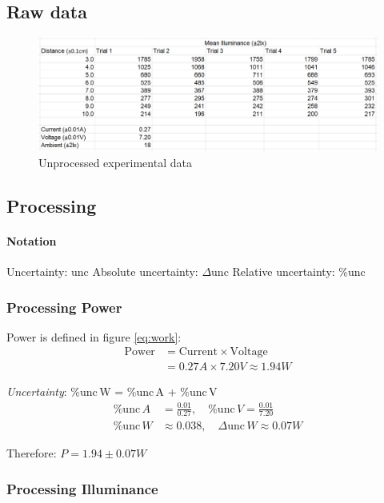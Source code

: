 \documentclass[a4paper,12pt]{article}
\newcommand{\absun}{\Delta \text{unc}\,}
\newcommand{\relun}{\% \text{unc}\,}
\begin{document}
\subsection{Raw data}
\begin{figure}[h!]
    \centering
    \includegraphics[width=\textwidth]{assets/rawdata.png}
    \caption{Unprocessed experimental data}
    \label{fig:raw}
\end{figure}

\subsection{Processing}
\paragraph{Notation}

Uncertainty: unc \quad Absolute uncertainty: $\Delta$unc \quad Relative uncertainty: \%unc


\subsubsection{Processing Power}
Power is defined in figure \ref{eq:work}:
\begin{align*}
\text{Power} &= \text{Current} \times \text{Voltage}\\
        &= 0.27\si{A} \times 7.20\si{V} \approx 1.94 \si{W}
\end{align*}

\textit{Uncertainty}: $\relun$W =  $\relun$A +  $\relun$V
\begin{align*}
    \relun A &= \frac{0.01}{0.27},\quad \relun V = \frac{0.01}{7.20}\\
    \relun \si{W} &\approx 0.038,\quad \absun \si{W} \approx 0.07\si{W}
\end{align*}

Therefore: $P = 1.94 \pm 0.07 \si{W}$

\subsubsection{Processing Illuminance}
\end{document}
